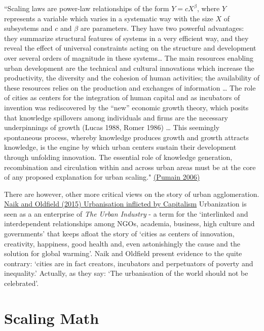 \documentclass[
]{book}
\begin{document}
``Scaling laws are power-law relationships of the form \(Y = cX^β\), where \(Y\) represents a
variable which varies in a systematic way with the size \(X\) of subsystems and \(c\) and \(β\) are
parameters. They have two powerful advantages: they summarize structural features of
systems in a very efficient way, and they reveal the effect of universal constraints acting
on the structure and development over several orders of magnitude in these systems\ldots{}
The main resources enabling urban
development are the technical and cultural innovations which increase the productivity,
the diversity and the cohesion of human activities; the availability of these resources
relies on the production and exchanges of information \ldots{}
The role of cities as centers for the integration of human capital and as incubators
of invention was rediscovered by the ``new'' economic growth theory, which posits that
knowledge spillovers among individuals and firms are the necessary underpinnings of
growth (Lucas 1988, Romer 1986) \ldots{}
This seemingly spontaneous
process, whereby knowledge produces growth and growth attracts knowledge, is the
engine by which urban centers sustain their development through unfolding innovation.
The essential role of knowledge generation, recombination and circulation within and
across urban areas must be at the core of any proposed explanation for urban scaling."
\href{https://journals.openedition.org/cybergeo/2519}{(Pumain 2006)}

There are however, other more critical views on the story of urban agglomeration.
\href{https://www.citymetric.com/horizons/urbanisation-not-natural-or-inevitable-its-being-inflicted-upon-us-forces-capitalism-900}{Naik and Oldfield (2015) Urbanisation inflicted by Capitalism}
Urbanization is seen as a an enterprise of \emph{The Urban Industry} - a term for the
`interlinked and interdependent relationships among NGOs, academia, business, high culture and governments' that keeps afloat the story of `cities as centers of innovation, creativity, happiness, good health and, even astonishingly the cause and the solution for global warming'. Naik and Oldfield
present evidence to the quite contrary: `cities are in fact creators, incubators and perpetuators of poverty and inequality.' Actually, as they say: `The urbanisation of the world should not be celebrated'.

\hypertarget{scaling-math}{%
\section{Scaling Math}\label{scaling-math}}
\end{document}
